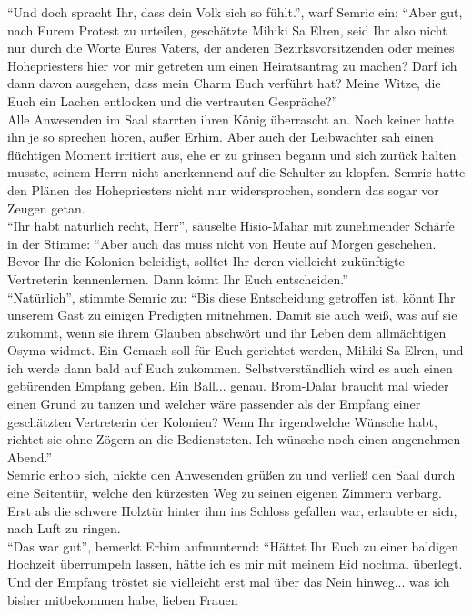 ``Und doch spracht Ihr, dass dein Volk sich so fühlt.'', warf Semric ein: ``Aber gut, nach Eurem 
Protest zu urteilen, geschätzte Mihiki Sa Elren, seid Ihr also nicht nur durch die Worte Eures 
Vaters, der anderen Bezirksvorsitzenden oder meines Hohepriesters hier vor mir getreten um einen 
Heiratsantrag zu machen? Darf ich dann davon ausgehen, dass mein Charm Euch verführt hat? Meine 
Witze, die Euch ein Lachen entlocken und die vertrauten Gespräche?''\\
Alle Anwesenden im Saal starrten ihren König überrascht an. Noch keiner hatte ihn je so sprechen 
hören, außer Erhim. Aber auch der Leibwächter sah einen flüchtigen Moment irritiert aus, ehe er zu 
grinsen begann und sich zurück halten musste, seinem Herrn nicht anerkennend auf die Schulter zu 
klopfen. Semric hatte den Plänen des Hohepriesters nicht nur widersprochen, sondern das sogar vor 
Zeugen getan.\\
``Ihr habt natürlich recht, Herr'', säuselte Hisio-Mahar mit zunehmender Schärfe in der Stimme: 
``Aber auch das muss nicht von Heute auf Morgen geschehen. Bevor Ihr die Kolonien beleidigt, 
solltet Ihr deren vielleicht zukünftigte Vertreterin kennenlernen. Dann könnt Ihr Euch 
entscheiden.''\\
``Natürlich'', stimmte Semric zu: ``Bis diese Entscheidung getroffen ist, könnt Ihr unserem Gast zu 
einigen Predigten mitnehmen. Damit sie auch weiß, was auf sie zukommt, wenn sie ihrem Glauben 
abschwört und ihr Leben dem allmächtigen Osyma widmet. Ein Gemach soll für Euch gerichtet werden, 
Mihiki Sa Elren, und ich werde dann bald auf Euch zukommen. Selbstverständlich wird es auch einen 
gebürenden Empfang geben. Ein Ball... genau. Brom-Dalar braucht mal wieder einen Grund zu tanzen 
und welcher wäre passender als der Empfang einer geschätzten Vertreterin der Kolonien? Wenn Ihr 
irgendwelche Wünsche habt, richtet sie ohne Zögern an die Bediensteten. Ich wünsche noch einen 
angenehmen Abend.''\\
Semric erhob sich, nickte den Anwesenden grüßen zu und verließ den Saal durch eine Seitentür, 
welche den kürzesten Weg zu seinen eigenen Zimmern verbarg. Erst als die schwere Holztür hinter ihm 
ins Schloss gefallen war, erlaubte er sich, nach Luft zu ringen.\\
``Das war gut'', bemerkt Erhim aufmunternd: ``Hättet Ihr Euch zu einer baldigen Hochzeit 
überrumpeln lassen, hätte ich es mir mit meinem Eid nochmal überlegt. Und der Empfang tröstet 
sie vielleicht erst mal über das Nein hinweg... was ich bisher mitbekommen habe, lieben Frauen 
